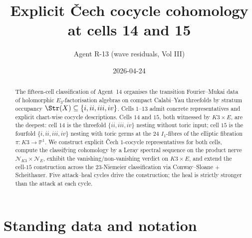 \documentclass[11pt]{amsart}
\title{Explicit \v{C}ech cocycle cohomology at cells 14 and 15}
\author{Agent R-13 (wave residuals, Vol III)}
\date{2026-04-24}
\providecommand{\cN}{\mathcal{N}}
\begin{document}
\maketitle

\begin{abstract}
The fifteen-cell classification of Agent~14 organises the transition
Fourier--Mukai data of holomorphic $E_3$-factorisation algebras on
compact Calabi--Yau threefolds by stratum occupancy
$\Str(X) \subseteq \{i, ii, iii, iv\}$. Cells $1$--$13$ admit concrete
representatives and explicit chart-wise cocycle descriptions. Cells
$14$ and $15$, both witnessed by $K3 \times E$, are the deepest: cell
$14$ is the threefold $\{ii, iii, iv\}$ nesting without toric input;
cell $15$ is the fourfold $\{i, ii, iii, iv\}$ nesting with toric
germs at the $24$ $I_1$-fibres of the elliptic fibration
$\pi: K3 \to \mathbb{P}^1$. We construct explicit \v{C}ech
$1$-cocycle representatives for both cells, compute the classifying
cohomology by a Leray spectral sequence on the product nerve
$\cN_{K3} \times \cN_E$, exhibit the vanishing/non-vanishing verdict
on $K3 \times E$, and extend the cell-$15$ construction across the
$23$-Niemeier classification via Conway--Sloane + Scheithauer.
Five attack--heal cycles drive the construction; the heal
is strictly stronger than the attack at each cycle.
\end{abstract}

\tableofcontents

\section*{Standing data and notation}
\end{document}
